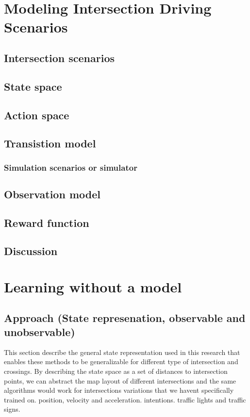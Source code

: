 \chapter{Modeling Intersection Driving Scenarios}
\section{Intersection scenarios}
\section{State space}
\section{Action space}
\section{Transistion model}
\subsection{Simulation scenarios or simulator}
\section{Observation model}
\section{Reward function}
\section{Discussion}




\chapter{Learning without a model}
\section{Approach (State represenation, observable and unobservable)}

This section describe the general state representation used in this research that enables these methods to be generalizable for different type of intersection and crossings. 
By describing the state space as a set of distances to intersection points, we can abstract the map layout of different intersections and the same algorithms would work for intersections variations that we havent specifically trained on. 
position, velocity and acceleration. 
intentions. traffic lights and traffic signs. 
